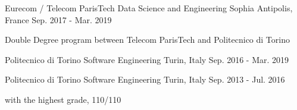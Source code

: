 

\begin{cventries}

  \cventry
    {Eurecom / Telecom ParisTech} %
    { Data Science and Engineering} %
    {Sophia Antipolis, France} %
    {Sep. 2017 - Mar. 2019} %
    {
      \begin{cvitems} %
        \item {Double Degree program between Telecom ParisTech and Politecnico di Torino}
      \end{cvitems}
    }
  
  \cventry
    {Politecnico di Torino}
    { Software Engineering}
    {Turin, Italy}
    {Sep. 2016 - Mar. 2019}
    {}
  
  \cventry
    {Politecnico di Torino}
    { Software Engineering}
    {Turin, Italy}
    {Sep. 2013 - Jul. 2016}
    {
      \begin{cvitems}
        \item {with the highest grade, \textsc{110/110}}
      \end{cvitems}
    }

\end{cventries}
